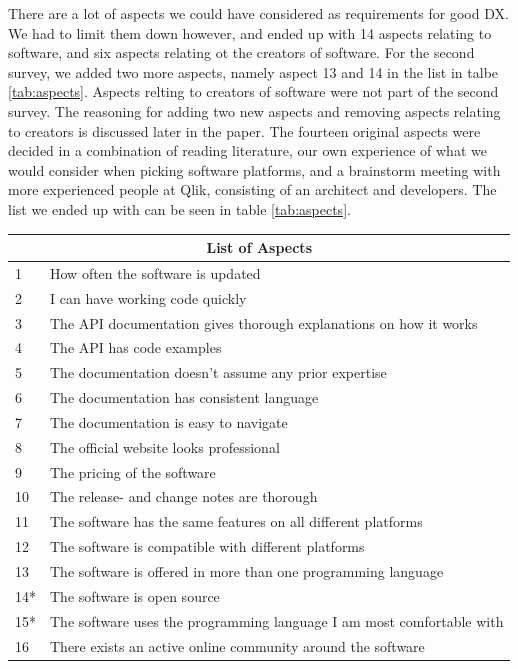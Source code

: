 \documentclass{article}
\begin{document}
There are a lot of aspects we could have considered as requirements for
good DX. We had to limit them down however, and ended up with 14 aspects relating to software, and six aspects relating ot the
creators of software.
For the second survey, we added two more aspects, namely aspect 13 and 14 in the list in talbe \ref{tab:aspects}. Aspects relting to
creators of software were not part of the second survey.
The reasoning for adding two new aspects and removing aspects relating to creators is
discussed later in the paper. The fourteen original aspects were decided in a combination
of reading literature, our own experience of what we would consider when
picking software platforms, and a brainstorm meeting with more experienced
people at Qlik, consisting of an architect and developers.
The list we ended up with can be seen in table \ref{tab:aspects}.
\begin{table}[H]
\centering
\begin{tabularx}{\columnwidth}{l X}
\multicolumn{2}{c}{\textbf{List of Aspects}} \\
\hline
1    & How often the software is updated    \\
2    & I can have working code quickly  \\
3    & The API documentation gives thorough explanations on how it works    \\
4    & The API has code examples    \\
5    & The documentation doesn't assume any prior expertise \\
6    & The documentation has consistent language    \\
7    & The documentation is easy to navigate    \\
8    & The official website looks professional  \\
9    & The pricing of the software  \\
10    &  The release- and change notes are thorough \\
11   &  The software has the same features on all different platforms   \\
12    &  The software is compatible with different platforms    \\
13  &  The software is offered in more than one programming language    \\
14*    &  The software is open source    \\
15*    &  The software uses the programming language I am most comfortable with  \\
16    &  There exists an active online community around the software    \\

\end{tabularx}
\end{table}
\end{document}
